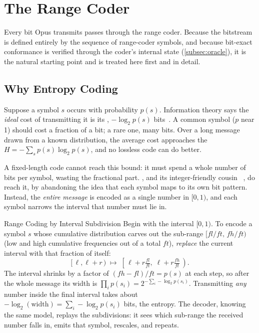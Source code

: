 \section{The Range Coder}\label{sec:rangecoder}

Every bit Opus transmits passes through the range coder. Because the bitstream
is defined entirely by the sequence of range-coder symbols, and because
bit-exact conformance is verified through the coder's internal state
(\cref{subsec:oracle}), it is the natural starting point and is treated here
first and in detail.

\subsection{Why Entropy Coding}\label{subsec:why_entropy}

Suppose a symbol $s$ occurs with probability $p(s)$. Information theory says the
\emph{ideal} cost of transmitting it is its ,
$-\log_2 p(s)$ bits~\cite{shannon1948mathematical,cover2006elements}. A common
symbol ($p$ near 1) should cost a fraction of a bit; a rare one, many bits. Over
a long message drawn from a known distribution, the average cost approaches the
 $H = -\sum_s p(s)\log_2 p(s)$, and no lossless code can do
better.

A fixed-length code cannot reach this bound: it must spend a whole number of
bits per symbol, wasting the fractional part. , and
its integer-friendly cousin ~\cite{martin1979range,
witten1987arithmetic}, do reach it, by abandoning the idea that each symbol maps
to its own bit pattern. Instead, the \emph{entire message} is encoded as a
single number in $[0, 1)$, and each symbol narrows the interval that number must
lie in.

\begin{concept}{Range Coding by Interval Subdivision}
  Begin with the interval $[0, 1)$. To encode a symbol $s$ whose cumulative
  distribution carves out the sub-range $[\mathit{fl}/\mathit{ft},\,
  \mathit{fh}/\mathit{ft})$ (low and high cumulative frequencies out of a total
  $\mathit{ft}$), \emph{replace} the current interval with that fraction of
  itself:
  \begin{equation}\label{eq:rc_subdivide}
    [\,\ell, \ell + r\,) \;\longmapsto\;
    \left[\,\ell + r\tfrac{\mathit{fl}}{\mathit{ft}},\;
    \ell + r\tfrac{\mathit{fh}}{\mathit{ft}}\,\right).
  \end{equation}
  The interval shrinks by a factor of $(\mathit{fh}-\mathit{fl})/\mathit{ft} =
  p(s)$ at each step, so after the whole message its width is $\prod_i p(s_i) =
  2^{-\sum_i -\log_2 p(s_i)}$. Transmitting \emph{any} number inside the final
  interval takes about $-\log_2(\text{width}) = \sum_i -\log_2 p(s_i)$ bits,
  the entropy. The decoder, knowing the same model, replays the subdivisions:
  it sees which sub-range the received number falls in, emits that symbol,
  rescales, and repeats.
\end{concept}

